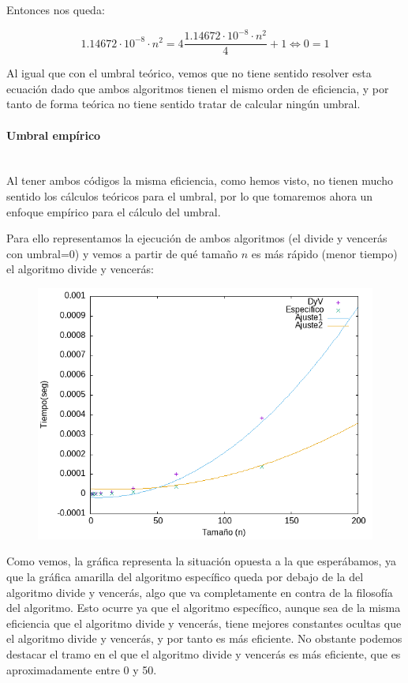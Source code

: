 \documentclass{article}
\newcommand{\myparagraph}[1]{\paragraph{#1}\mbox{}\\}
\begin{document}
    Entonces nos queda:

    $$
    1.14672 \cdot 10^{-8} \cdot n^2=4\frac{1.14672 \cdot 10^{-8} \cdot n^2}{4}+1 \iff 0=1
    $$

    Al igual que con el umbral teórico, vemos que no tiene sentido resolver esta ecuación dado que ambos algoritmos tienen el mismo orden de eficiencia, y por tanto de forma teórica no tiene sentido tratar de calcular ningún umbral.

    \myparagraph{Umbral empírico}

    Al tener ambos códigos la misma eficiencia, como hemos visto, no tienen mucho
    sentido los cálculos teóricos para el umbral, por lo que tomaremos ahora
    un enfoque empírico para el cálculo del umbral.

    Para ello representamos la ejecución de ambos algoritmos (el divide y vencerás con
    umbral=0) y vemos a partir de qué tamaño $n$ es más rápido (menor tiempo) el
    algoritmo divide y vencerás:

    \begin{figure}[H]
        \centering
        \includegraphics[scale=0.7]{P2/u1.png} 
    \end{figure}

    Como vemos, la gráfica representa la situación opuesta a la que esperábamos,
    ya que la gráfica amarilla del algoritmo específico queda por debajo de la 
    del algoritmo divide y vencerás, algo que va completamente en contra de la
    filosofía del algoritmo. Esto ocurre ya que el algoritmo específico, aunque
    sea de la misma eficiencia que el algoritmo divide y vencerás, tiene mejores
    constantes ocultas que el algoritmo divide y vencerás, y por tanto es más
    eficiente. No obstante podemos destacar el tramo en el que el algoritmo divide
    y vencerás es más eficiente, que es aproximadamente entre 0 y 50.
\end{document}
